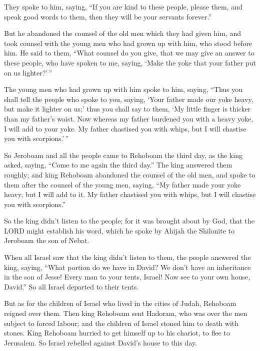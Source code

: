  They spoke to him, saying, ``If you are kind to these
people, please them, and speak good words to them, then they will be
your servants forever.''

 But he abandoned the counsel of the old men which they
had given him, and took counsel with the young men who had grown up with
him, who stood before him.  He said to them, ``What
counsel do you give, that we may give an answer to these people, who
have spoken to me, saying, `Make the yoke that your father put on us
lighter?'\,''

 The young men who had grown up with him spoke to him,
saying, ``Thus you shall tell the people who spoke to you, saying, `Your
father made our yoke heavy, but make it lighter on us;' thus you shall
say to them, `My little finger is thicker than my father's waist.
 Now whereas my father burdened you with a heavy yoke, I
will add to your yoke. My father chastised you with whips, but I will
chastise you with scorpions.'\,''

 So Jeroboam and all the people came to Rehoboam the
third day, as the king asked, saying, ``Come to me again the third
day.''  The king answered them roughly; and king Rehoboam
abandoned the counsel of the old men,  and spoke to them
after the counsel of the young men, saying, ``My father made your yoke
heavy, but I will add to it. My father chastised you with whips, but I
will chastise you with scorpions.''

 So the king didn't listen to the people; for it was
brought about by God, that the LORD might establish his word, which he
spoke by Ahijah the Shilonite to Jeroboam the son of Nebat.

 When all Israel saw that the king didn't listen to them,
the people answered the king, saying, ``What portion do we have in
David? We don't have an inheritance in the son of Jesse! Every man to
your tents, Israel! Now see to your own house, David.'' So all Israel
departed to their tents.

 But as for the children of Israel who lived in the
cities of Judah, Rehoboam reigned over them.  Then king
Rehoboam sent Hadoram, who was over the men subject to forced labour;
and the children of Israel stoned him to death with stones. King
Rehoboam hurried to get himself up to his chariot, to flee to Jerusalem.
 So Israel rebelled against David's house to this day.

